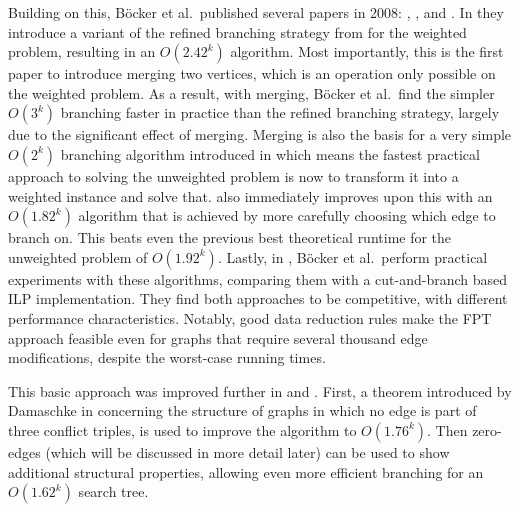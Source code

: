 \documentclass{article}
\begin{document}
Building on this, Böcker et al.\ published several papers in 2008: \cite{AnApproach},
\cite{GoingWeighted}, and \cite{ExactAlgos}. In \cite{AnApproach} they introduce a variant of the
refined branching strategy from \cite{Gramm} for the weighted problem, resulting in an $O(2.42^k)$
algorithm. Most importantly, this is the first paper to introduce merging two vertices, which is an
operation only possible on the weighted problem. As a result, with merging, Böcker et al.\ find the
simpler $O(3^k)$ branching faster in practice than the refined branching strategy, largely due to
the significant effect of merging. Merging is also the basis for a very simple $O(2^k)$ branching
algorithm introduced in \cite{GoingWeighted} which means the fastest practical approach to solving the
unweighted problem is now to transform it into a weighted instance and solve that.
\cite{GoingWeighted} also immediately improves upon this with an $O(1.82^k)$ algorithm that is
achieved by more carefully choosing which edge to branch on. This beats even the previous best
theoretical runtime for the unweighted problem of $O(1.92^k)$. Lastly, in \cite{ExactAlgos}, Böcker
et al.\ perform practical experiments with these algorithms, comparing them with a cut-and-branch
based ILP implementation. They find both approaches to be competitive, with different performance
characteristics. Notably, good data reduction rules make the FPT approach feasible even for graphs
that require several thousand edge modifications, despite the worst-case running times.

This basic approach was improved further in \cite[Böcker and Damaschke, 2011]{EvenFaster} and
\cite[Böcker, 2012]{GoldenRatio}. First, a theorem introduced by Damaschke in \cite{BoundedDegree}
concerning the structure of graphs in which no edge is part of three conflict triples, is used to
improve the algorithm to $O(1.76^k)$. Then zero-edges (which will be discussed in more detail later)
can be used to show additional structural properties, allowing even more efficient branching for an
$O(1.62^k)$ search tree.
\end{document}
